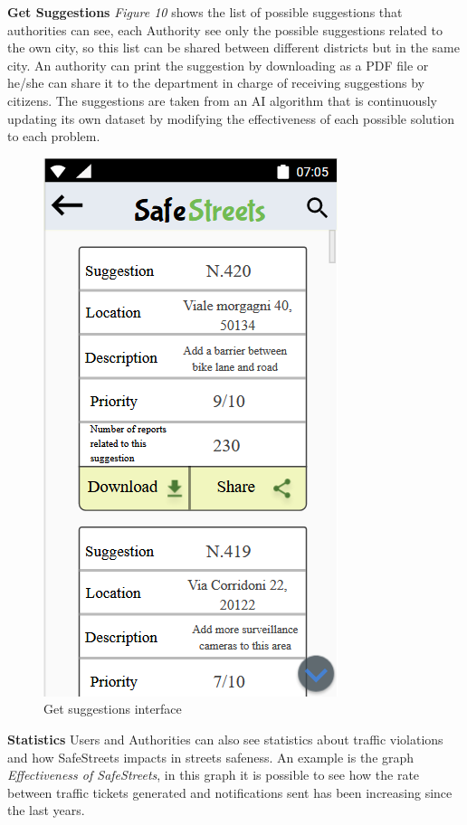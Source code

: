     \newpage\vspace{3mm}
    \noindent\textbf{Get Suggestions}\newline
    \textit{Figure 10} shows the list of possible suggestions that authorities can see, each Authority see only the possible suggestions related to the own city, so this list can be shared between different districts but in the same city. An authority can print the suggestion by downloading as a PDF file or he/she can share it to the department in charge of receiving suggestions by citizens. The suggestions are taken from an AI algorithm  that is continuously updating its own dataset by modifying the effectiveness of each possible solution to each problem.  
    
       \begin{figure}[h]
        \centering
        \includegraphics[scale=0.9]{Images/suggestions.png}
        \caption{Get suggestions interface}
    \end{figure}\vspace{5mm}
    \noindent\textbf{Statistics}\newline
    Users and Authorities can also see statistics about traffic violations and how SafeStreets impacts in streets safeness. An example is the graph \textit{Effectiveness of SafeStreets}, in this graph it is possible to see how the rate between traffic tickets generated and notifications sent has been increasing since the last years.  
